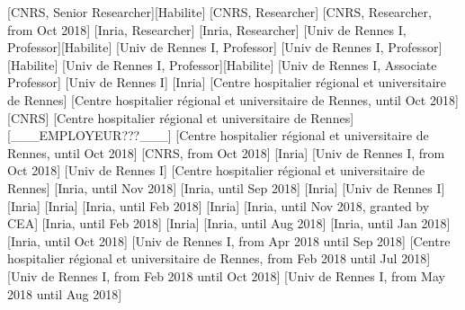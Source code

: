 \documentclass{ra2018}
\begin{document}
\begin{composition}
[CNRS, Senior Researcher][Habilite]
[CNRS, Researcher]
[CNRS, Researcher, from Oct 2018]
[Inria, Researcher]
[Inria, Researcher]
[Univ de Rennes I, Professor][Habilite]
[Univ de Rennes I, Professor]
[Univ de Rennes I, Professor][Habilite]
[Univ de Rennes I, Professor][Habilite]
[Univ de Rennes I, Associate Professor]
[Univ de Rennes I]
[Inria]
[Centre hospitalier régional et universitaire de Rennes]
[Centre hospitalier régional et universitaire de Rennes, until Oct 2018]
[CNRS]
[Centre hospitalier régional et universitaire de Rennes]
[\_\_\_EMPLOYEUR???\_\_\_]
[Centre hospitalier régional et universitaire de Rennes, until Oct 2018]
[CNRS, from Oct 2018]
[Inria]
[Univ de Rennes I, from Oct 2018]
[Univ de Rennes I]
[Centre hospitalier régional et universitaire de Rennes]
[Inria, until Nov 2018]
[Inria, until Sep 2018]
[Inria]
[Univ de Rennes I]
[Inria]
[Inria]
[Inria, until Feb 2018]
[Inria]
[Inria, until Nov 2018, granted by CEA]
[Inria, until Feb 2018]
[Inria]
[Inria, until Aug 2018]
[Inria, until Jan 2018]
[Inria, until Oct 2018]
[Univ de Rennes I, from Apr 2018 until Sep 2018]
[Centre hospitalier régional et universitaire de Rennes, from Feb 2018 until Jul 2018]
[Univ de Rennes I, from Feb 2018 until Oct 2018]
[Univ de Rennes I, from May 2018 until Aug 2018]

\end{composition}
\end{document}
